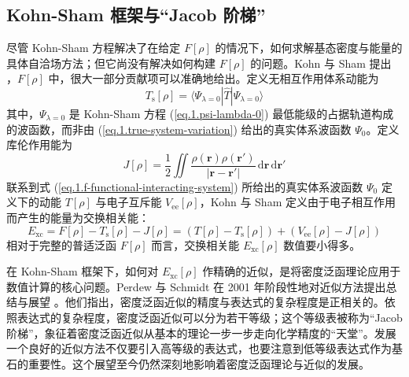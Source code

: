 \subsection{Kohn-Sham 框架与“Jacob 阶梯”}

尽管 Kohn-Sham 方程解决了在给定 $F[\rho]$ 的情况下，如何求解基态密度与能量的具体自洽场方法；但它尚没有解决如何构建 $F[\rho]$ 的问题。Kohn 与 Sham 提出 \cite{Kohn-Sham.PR.1965}，$F[\rho]$ 中，很大一部分贡献项可以准确地给出。定义无相互作用体系动能为
\begin{equation}
  T_\mathrm{s} [\rho] = \langle \Psi_{\lambda = 0} | \hat T | \Psi_{\lambda = 0} \rangle
\end{equation}
其中，$\Psi_{\lambda = 0}$ 是 Kohn-Sham 方程 (\ref{eq.1.psi-lambda-0}) 最低能级的占据轨道构成的波函数，而非由 (\ref{eq.1.true-system-variation}) 给出的真实体系波函数 $\Psi_0$。定义库伦作用能为
\begin{equation}
  J[\rho] = \frac{1}{2} \iint \frac{\rho(\bm{r}) \rho(\bm{r}')}{|\bm{r} - \bm{r}'|} \, \mathrm{d} \bm{r} \, \mathrm{d} \bm{r}'
\end{equation}
联系到式 (\ref{eq.1.f-functional-interacting-system}) 所给出的真实体系波函数 $\Psi_0$ 定义下的动能 $T[\rho]$ 与电子互斥能 $V_\mathrm{ee} [\rho]$，Kohn 与 Sham 定义由于电子相互作用而产生的能量为交换相关能：
\begin{equation}
  E_\mathrm{xc} = F[\rho] - T_\mathrm{s} [\rho] - J[\rho] = (T[\rho] - T_\mathrm{s} [\rho]) + (V_\mathrm{ee} [\rho] - J[\rho])
\end{equation}
相对于完整的普适泛函 $F[\rho]$ 而言，交换相关能 $E_\mathrm{xc}[\rho]$ 数值要小得多。

在 Kohn-Sham 框架下，如何对 $E_\mathrm{xc}[\rho]$ 作精确的近似，是将密度泛函理论应用于数值计算的核心问题。Perdew 与 Schmidt 在 2001 年阶段性地对近似方法提出总结与展望 \cite{Perdew-Schmidt.ACP.2001}。他们指出，密度泛函近似的精度与表达式的复杂程度是正相关的。依照表达式的复杂程度，密度泛函近似可以分为若干等级；这个等级表被称为“Jacob 阶梯”，象征着密度泛函近似从基本的理论一步一步走向化学精度的“天堂”。发展一个良好的近似方法不仅要引入高等级的表达式，也要注意到低等级表达式作为基石的重要性。这个展望至今仍然深刻地影响着密度泛函理论与近似的发展。

